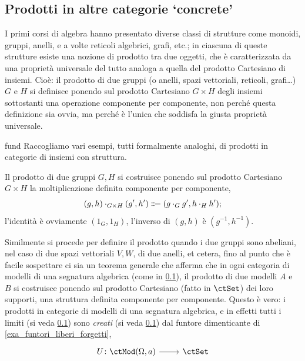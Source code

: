 \subsection{Prodotti in altre categorie `concrete'}
I primi corsi di algebra hanno presentato diverse classi di strutture come monoidi, gruppi, anelli, e a volte reticoli algebrici, grafi, etc.; in ciascuna di queste strutture esiste una nozione di prodotto tra due oggetti, che è caratterizzata da una proprietà universale del tutto analoga a quella del prodotto Cartesiano di insiemi. Cioè: il prodotto di due gruppi (o anelli, spazi vettoriali, reticoli, grafi\dots) \(G\) e \(H\) si definisce ponendo sul prodotto Cartesiano \(G\times H\) degli insiemi sottostanti una operazione componente per componente, non perché questa definizione sia ovvia, ma perché è l'unica che soddisfa la giusta proprietà universale.
\begin{hExample}{fund}\label{prodotti_cat_strutturate}
 Raccogliamo vari esempi, tutti formalmente analoghi, di prodotti in categorie di insiemi con struttura.

 Il prodotto di due gruppi \(G,H\) si costruisce ponendo sul prodotto Cartesiano \(G\times H\) la moltiplicazione definita componente per componente,
 \[(g,h) \cdot_{G\times H} (g',h') \defeq (g\cdot_G g', h\cdot_H h');\]
 l'identità è ovviamente \((1_G,1_H)\), l'inverso di \((g,h)\) è \((g^{-1},h^{-1})\).

 Similmente si procede per definire il prodotto quando i due gruppi sono abeliani, nel caso di due spazi vettoriali \(V,W\), di due anelli, et cetera, fino al punto che è facile sospettare ci sia un teorema generale che afferma che in ogni categoria di modelli di una segnatura algebrica (come in \ref{}), il prodotto di due modelli	\(A\) e \(B\) si costruisce ponendo sul prodotto Cartesiano (fatto in \(\ctSet\)) dei loro supporti, una struttura definita componente per componente. Questo è vero: i prodotti in categorie di modelli di una segnatura algebrica, e in effetti tutti i limiti (si veda \ref{}) sono \emph{creati} (si veda \ref{}) dal funtore dimenticante di \ref{exa_funtori_liberi_forgetti},
 \[\dmFun{U}{\ctMod(\Omega,a)}{\ctSet}\]
\end{hExample}

